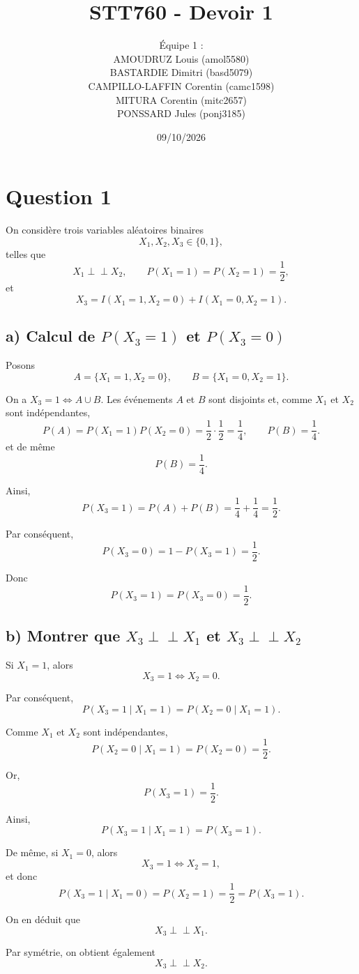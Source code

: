 \documentclass{article}
\title{STT760 - Devoir 1}
\author{Équipe 1 :\\
    AMOUDRUZ Louis (amol5580) \\
    BASTARDIE Dimitri (basd5079) \\
    CAMPILLO-LAFFIN Corentin (camc1598) \\
    MITURA Corentin (mitc2657) \\
    PONSSARD Jules (ponj3185) 
}
\date{09/10/2026}
\begin{document}
\maketitle

\section*{Question 1}

On considère trois variables aléatoires binaires
\[
X_1,X_2,X_3\in\{0,1\},
\]
telles que
\[
X_1 \perp\!\!\!\perp X_2,
\qquad
P(X_1=1)=P(X_2=1)=\frac12,
\]
et
\[
X_3
=
I(X_1=1,X_2=0)
+
I(X_1=0,X_2=1).
\]

\subsection*{a) Calcul de $P(X_3=1)$ et $P(X_3=0)$}

Posons
\[
A=\{X_1=1,X_2=0\},
\qquad
B=\{X_1=0,X_2=1\}.
\]

On a $X_3=1 \iff A\cup B$. Les événements $A$ et $B$ sont disjoints et, comme
$X_1$ et $X_2$ sont indépendantes,
\[
P(A)=P(X_1=1)P(X_2=0)=\frac12\cdot\frac12=\frac14,
\qquad
P(B)=\frac14.
\]
et de même
\[
P(B)=\frac14.
\]

Ainsi,
\[
P(X_3=1)
=
P(A)+P(B)
=
\frac14+\frac14
=
\frac12.
\]

Par conséquent,
\[
P(X_3=0)
=
1-P(X_3=1)
=
\frac12.
\]

Donc
\[
P(X_3=1)=P(X_3=0)=\frac12.
\]

\subsection*{b) Montrer que $X_3 \perp\!\!\!\perp X_1$ et $X_3 \perp\!\!\!\perp X_2$}

Si $X_1=1$, alors
\[
X_3=1
\iff X_2=0.
\]

Par conséquent,
\[
P(X_3=1\mid X_1=1)
=
P(X_2=0\mid X_1=1).
\]

Comme $X_1$ et $X_2$ sont indépendantes,
\[
P(X_2=0\mid X_1=1)
=
P(X_2=0)
=
\frac12.
\]

Or,
\[
P(X_3=1)=\frac12.
\]

Ainsi,
\[
P(X_3=1\mid X_1=1)
=
P(X_3=1).
\]

De même, si $X_1=0$, alors
\[
X_3=1
\iff X_2=1,
\]
et donc
\[
P(X_3=1\mid X_1=0)
=
P(X_2=1)
=
\frac12
=
P(X_3=1).
\]

On en déduit que
\[
X_3 \perp\!\!\!\perp X_1.
\]

Par symétrie, on obtient également
\[
X_3 \perp\!\!\!\perp X_2.
\]
\end{document}
